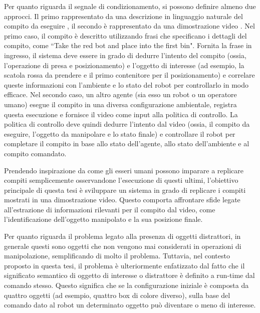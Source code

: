 Per quanto riguarda il segnale di condizionamento, si possono definire almeno due approcci. Il primo rappresentato da una descrizione in linguaggio naturale del compito da eseguire \cite{stepputtis2020language,mees2022calvin,brohan2022rt}, il secondo è rappresentato da una dimostrazione video \cite{dasari2021transformers_one_shot,mandi2022towards_more_generalizable_one_shot}.
\newline Nel primo caso, il compito è descritto utilizzando frasi che specificano i dettagli del compito, come ``Take the red bot and place into the first bin". Fornita la frase in ingresso, il sistema deve essere in grado di dedurre l'intento del compito (ossia, l'operazione di presa e posizionamento) e l'oggetto di interesse (ad esempio, la scatola rossa da prendere e il primo contenitore per il posizionamento) e correlare queste informazioni con l'ambiente e lo stato del robot per controllarlo in modo efficace.
\newline Nel secondo caso, un altro agente (sia esso un robot o un operatore umano) esegue il compito in una diversa configurazione ambientale, registra questa esecuzione e fornisce il video come input alla politica di controllo. La politica di controllo deve quindi dedurre l'intento dal video (ossia, il compito da eseguire, l'oggetto da manipolare e lo stato finale) e controllare il robot per completare il compito in base allo stato dell'agente, allo stato dell'ambiente e al compito comandato.

Prendendo inspirazione  da come gli esseri umani possono imparare a replicare compiti semplicemente osservandone l'esecuzione di questi ultimi, l'obiettivo principale di questa tesi è sviluppare un sistema in grado di replicare i compiti mostrati in una dimostrazione video. Questo comporta affrontare sfide legate all'estrazione di informazioni rilevanti per il compito dal video, come l'identificazione dell'oggetto manipolato e la sua posizione finale.

Per quanto riguarda il problema legato alla presenza di oggetti distrattori, in generale questi sono oggetti che non vengono mai considerati in operazioni di manipolazione, semplificando di molto il problema. Tuttavia, nel contesto proposto in questa tesi, il problema è ulteriormente enfatizzato dal fatto che il significato semantico di oggetto di interesse o distrattore  è definito a run-time dal comando stesso. Questo significa che se la configurazione iniziale è composta da quattro oggetti (ad esempio, quattro box di colore diverso), sulla base del comando dato al robot un determinato oggetto può diventare o meno di interesse.

